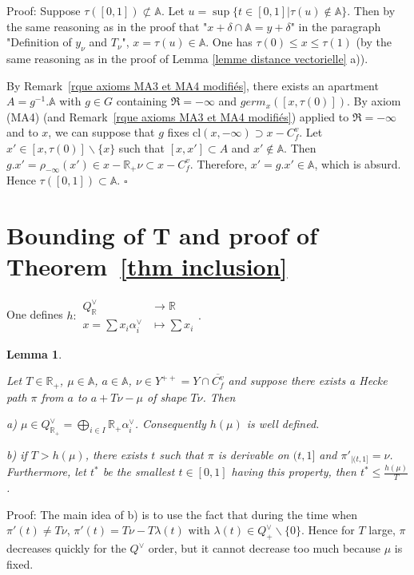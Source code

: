 \documentclass[12pt]{article}
\theoremstyle{plain}
\newtheorem{lemme}[thm]{Lemma}
\theoremstyle{definition}
\newcommand{\R}{\mathbb{R}}
\newcommand{\A}{\mathbb{A}}
\begin{document}
Proof: Suppose $\tau([0,1])\not\subset \A$. Let $u=\sup\{t\in [0,1]|\tau(u)\notin \A\}$. Then by the same reasoning as in the proof that "$x+\delta\cap\A=y+\delta$" in the paragraph "Definition of $y_\nu$ and $T_\nu$", $x=\tau(u)\in\A$. One has $\tau(0)\leq x\leq \tau(1)$ (by the same reasoning as in the proof of Lemma \ref{lemme distance vectorielle} a)). 

By Remark~\ref{rque axioms MA3 et MA4 modifiés}, there exists an apartment $A=g^{-1}.\A$ with $g\in G$ containing $\mathfrak{R}=-\infty$ and $germ_x([x,\tau(0)])$. By axiom (MA4) (and Remark~\ref{rque axioms MA3 et MA4 modifiés}) applied to $\mathfrak{R}=-\infty$ and to $x$, we can suppose that $g$ fixes $\mathrm{cl}(x,-\infty)\supset x-C_f^v$.  
Let $x'\in [x,\tau(0)]\backslash\{x\}$ such that $[x,x']\subset A$ and $x'\notin \A$. Then $g.x'=\rho_{-\infty}(x')\in x-\R_+\nu\subset x-C_f^v$. Therefore, $x'=g.x'\in \A$, which is absurd. Hence $\tau([0,1])\subset \A$. $\square$





\section{Bounding of T and proof of Theorem~\ref{thm inclusion} }\label{sect bounding of T}


One defines $h:\begin{aligned} Q^\vee_{\mathbb{R}}& \rightarrow \mathbb{R}\\
x=\sum x_i\alpha_i^\vee & \mapsto \sum x_i\end{aligned}.$




\begin{lemme}\label{lemme fin des chemins de Hecke longs}


Let $T\in \mathbb{R}_+$, $\mu\in \A$,  $a\in \mathbb{A}$, $\nu\in Y^{++}=Y\cap\overline{C^v_f}$ and suppose there exists a Hecke path $\pi$ from $a$ to $a+T\nu-\mu$ of shape $T\nu$. Then 

a) $\mu\in Q^\vee_{\R_+}=\bigoplus_{i\in I}\R_+\alpha_i^\vee$. Consequently $h(\mu)$ is well defined.

b) if $T>h(\mu)$, there exists $t$ such that $\pi$ is derivable on $(t,1]$ and $\pi'_{|(t,1]}=\nu$. Furthermore, let $t^*$ be the smallest $t \in [0,1]$ having this property, then $t^*\leq \frac{h(\mu)}{T}$.
\end{lemme}


Proof: The main idea of b) is to use the fact that during the time when $\pi'(t)\neq T\nu$, $\pi'(t)=T\nu-T\lambda(t)$ with $\lambda(t)\in Q^\vee_+\backslash \{0\}$. Hence for $T$ large, $\pi$ decreases quickly for the $Q^\vee$ order, but it cannot decrease too much because $\mu$ is fixed.
\end{document}
